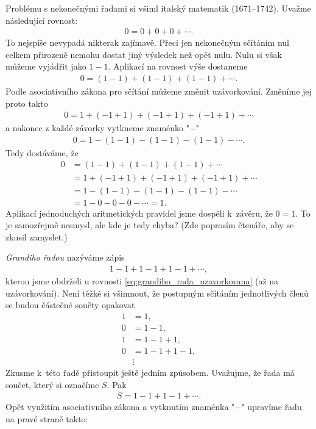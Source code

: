 Problému s nekonečnými řadami si všiml italský matematik  (1671--1742). Uvažme následující rovnost:
\begin{align*}
0=0+0+0+\cdots .
\end{align*}
To nejspíše nevypadá nikterak zajímavě. Přeci jen nekonečným sčítáním nul celkem přirozeně nemohu dostat jiný výsledek než opět nulu. Nulu si však můžeme vyjádřit jako $1-1$. Aplikací na rovnost výše dostaneme
\begin{align}
\label{eq:grandiho_rada_uzavorkovana}
0=(1-1)+(1-1)+(1-1)+\cdots .
\end{align}
Podle asociativního zákona pro sčítání můžeme změnit uzávorkování. Změníme jej proto takto
\begin{align*}
0=1+(-1+1)+(-1+1)+(-1+1)+\cdots
\end{align*}
a nakonec z každé závorky vytkneme znaménko "$-$"
\begin{align*}
0=1-(1-1)-(1-1)-(1-1)-\cdots .
\end{align*}
Tedy dostáváme, že
\begin{align*}
0&=(1-1)+(1-1)+(1-1)+\cdots \\ &= 1+(-1+1)+(-1+1)+(-1+1)+\cdots \\ &= 1-(1-1)-(1-1)-(1-1)-\cdots \\ &= 1-0-0-0-\cdots = 1 .
\end{align*}
Aplikací jednoduchých aritmetických pravidel jsme dospěli k~závěru, že $0=1$. To je samozřejmě nesmysl, ale kde je tedy chyba? (Zde poprosím čtenáře, aby se zkusil zamyslet.)\par
\emph{Grandiho řadou} nazýváme zápis
\begin{align*}
1-1+1-1+1-1+\cdots ,
\end{align*}
kterou jsme obdrželi u rovnosti \eqref{eq:grandiho_rada_uzavorkovana} (až na uzávorkování). Není těžké si všimnout, že postupným sčítáním jednotlivých členů se budou částečné součty opakovat
\begin{align*}
1&=1 ,\\
0&=1-1 ,\\
1&=1-1+1 ,\\
0&=1-1+1-1 ,\\
&\vdots
\end{align*}
Zkusme k~této řadě přistoupit ještě jedním způsobem. Uvažujme, že řada má součet, který si označíme $S$. Pak
\begin{align*}
S=1-1+1-1+\cdots .
\end{align*}
Opět využitím asociativního zákona a vytknutím znaménka "$-$" upravíme řadu na pravé straně takto:
